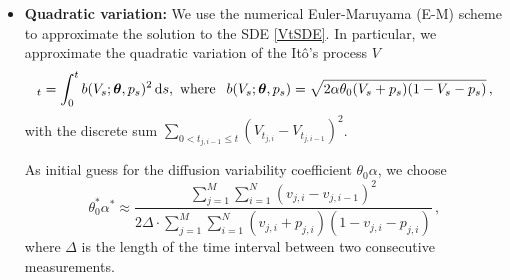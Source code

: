 \documentclass[11pt]{article}
\theoremstyle{definition}
\begin{document}
\begin{itemize}
\item \textbf{Quadratic variation:} We use the numerical Euler-Maruyama (E-M) scheme to approximate the solution to the SDE  \eqref{VtSDE}. In particular, we approximate the quadratic variation of the  It\^{o}'s  process $V$
\begin{equation*}
[V]_t=\int_0^t b(V_s; \bm{\theta}, p_s)^2 \dif s, \text{ where }  \:\: b(V_s; \bm{\theta}, p_s) = 
\sqrt{2 \alpha \theta_0 (V_s +p_s ) (1-V_s - p_s)}\,,
\end{equation*}
with the discrete sum $\sum_{0< t_{j, i-1} \leq t}\left(V_{t_{j, i}} - V_{t_{j, i-1}}\right)^2$.

As initial guess for the diffusion variability coefficient $\theta_0 \alpha$, we choose
\begin{equation}
\theta_0^*\alpha^*\approx\frac{\sum_{j=1}^M\sum_{i=1}^N(v_{j,i} - v_{j,i-1})^2}{2\Delta\cdot\sum_{j=1}^M\sum_{i=1}^N(v_{j,i}+p_{j,i})(1-v_{j,i}-p_{j,i})}\,,
\label{Eq-2}
\end{equation}
where $\Delta$ is the length of the time interval between two consecutive measurements.
\end{itemize}

%
\end{document}
